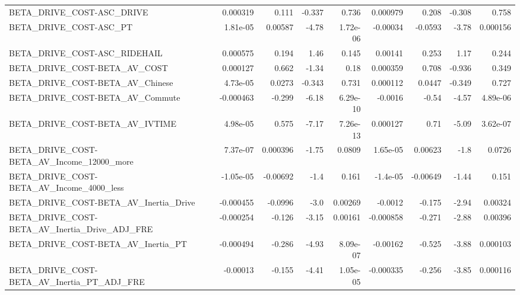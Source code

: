 \begin{tabular}{lrrrrrrrr}
BETA\_DRIVE\_COST-ASC\_DRIVE                          &    0.000319 &        0.111 &   -0.337 &    0.736 &   0.000979 &       0.208 &       -0.308 &         0.758 \\
BETA\_DRIVE\_COST-ASC\_PT                             &    1.81e-05 &      0.00587 &    -4.78 & 1.72e-06 &   -0.00034 &     -0.0593 &        -3.78 &      0.000156 \\
BETA\_DRIVE\_COST-ASC\_RIDEHAIL                       &    0.000575 &        0.194 &     1.46 &    0.145 &    0.00141 &       0.253 &         1.17 &         0.244 \\
BETA\_DRIVE\_COST-BETA\_AV\_COST                       &    0.000127 &        0.662 &    -1.34 &     0.18 &   0.000359 &       0.708 &       -0.936 &         0.349 \\
BETA\_DRIVE\_COST-BETA\_AV\_Chinese                    &    4.73e-05 &       0.0273 &   -0.343 &    0.731 &   0.000112 &      0.0447 &       -0.349 &         0.727 \\
BETA\_DRIVE\_COST-BETA\_AV\_Commute                    &   -0.000463 &       -0.299 &    -6.18 & 6.29e-10 &    -0.0016 &       -0.54 &        -4.57 &      4.89e-06 \\
BETA\_DRIVE\_COST-BETA\_AV\_IVTIME                     &    4.98e-05 &        0.575 &    -7.17 & 7.26e-13 &   0.000127 &        0.71 &        -5.09 &      3.62e-07 \\
BETA\_DRIVE\_COST-BETA\_AV\_Income\_12000\_more          &    7.37e-07 &     0.000396 &    -1.75 &   0.0809 &   1.65e-05 &     0.00623 &         -1.8 &        0.0726 \\
BETA\_DRIVE\_COST-BETA\_AV\_Income\_4000\_less           &   -1.05e-05 &     -0.00692 &     -1.4 &    0.161 &   -1.4e-05 &    -0.00649 &        -1.44 &         0.151 \\
BETA\_DRIVE\_COST-BETA\_AV\_Inertia\_Drive              &   -0.000455 &      -0.0996 &     -3.0 &  0.00269 &    -0.0012 &      -0.175 &        -2.94 &       0.00324 \\
BETA\_DRIVE\_COST-BETA\_AV\_Inertia\_Drive\_ADJ\_FRE      &   -0.000254 &       -0.126 &    -3.15 &  0.00161 &  -0.000858 &      -0.271 &        -2.88 &       0.00396 \\
BETA\_DRIVE\_COST-BETA\_AV\_Inertia\_PT                 &   -0.000494 &       -0.286 &    -4.93 & 8.09e-07 &   -0.00162 &      -0.525 &        -3.88 &      0.000103 \\
BETA\_DRIVE\_COST-BETA\_AV\_Inertia\_PT\_ADJ\_FRE         &    -0.00013 &       -0.155 &    -4.41 & 1.05e-05 &  -0.000335 &      -0.256 &        -3.85 &      0.000116 \\

\end{tabular}
